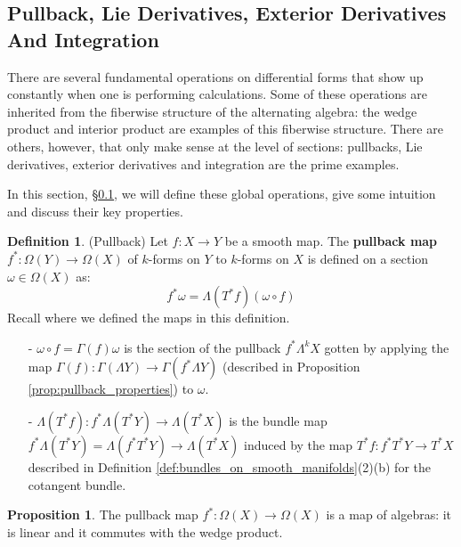 \documentclass[12pt]{article}
\theoremstyle{definition}
\newtheorem{definition}[theorem]{Definition}
\newtheorem{proposition}[theorem]{Proposition}
\numberwithin{equation}{section}
\begin{document}
\subsection{Pullback, Lie Derivatives, Exterior Derivatives And Integration} \label{subsec:exterior_calculus} There are several fundamental operations on differential forms that show up constantly when one is performing calculations. Some of these operations are inherited from the fiberwise structure of the alternating algebra: the wedge product and interior product are examples of this fiberwise structure. There are others, however, that only make sense at the level of sections: pullbacks, Lie derivatives, exterior derivatives and integration are the prime examples. 

In this section, \S \ref{subsec:exterior_calculus}, we will define these global operations, give some intuition and discuss their key properties.

\begin{definition} \label{def:form_pullback} (Pullback)  Let $f:X \to Y$ be a smooth map. The {\bf pullback map} $f^*:\Omega(Y) \to \Omega(X)$ of $k$-forms on $Y$ to $k$-forms on $X$ is defined on a section $\omega \in \Omega(X)$ as:
	\[
	f^*\omega = \Lambda(T^*f)(\omega \circ f)
	\]
Recall where we defined the maps in this definition.
\begin{itemize}
\item[-] $\omega \circ f = \Gamma(f)\omega$ is the section of the pullback $f^*\Lambda^kX$ gotten by applying the map $\Gamma(f):\Gamma(\Lambda Y) \to \Gamma(f^*\Lambda Y)$ (described in Proposition \ref{prop:pullback_properties}) to $\omega$.
\item[-] $\Lambda(T^*f):f^*\Lambda(T^*Y) \to \Lambda(T^*X)$ is the bundle map $f^*\Lambda(T^*Y) = \Lambda(f^*T^*Y) \to \Lambda(T^*X)$ induced by the map $T^*f:f^*T^*Y \to T^*X$ described in Definition \ref{def:bundles_on_smooth_manifolds}(2)(b) for the cotangent bundle. 
\end{itemize}
\end{definition}

\begin{proposition} The pullback map $f^*:\Omega(X) \to \Omega(X)$ is a map of algebras: it is linear and it commutes with the wedge product.
\end{proposition}
\end{document}
